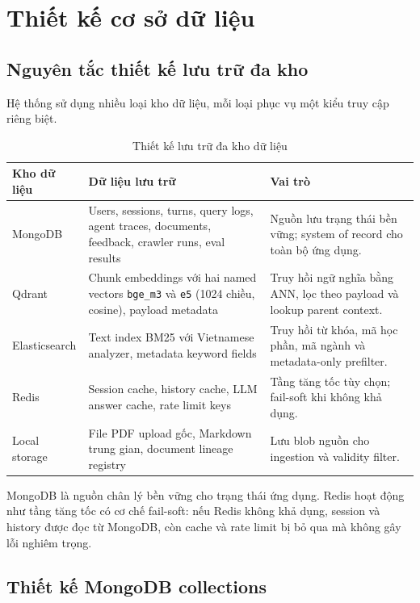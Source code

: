 \documentclass[../DoAn.tex]{subfiles}
\begin{document}
\section{Thiết kế cơ sở dữ liệu}

\subsection{Nguyên tắc thiết kế lưu trữ đa kho}

Hệ thống sử dụng nhiều loại kho dữ liệu, mỗi loại phục vụ một kiểu truy cập
riêng biệt.

\begin{table}[H]
\centering
\small
\begin{tabular}{|p{2.8cm}|p{5.0cm}|p{5.8cm}|}
\hline
\textbf{Kho dữ liệu} & \textbf{Dữ liệu lưu trữ} & \textbf{Vai trò} \\
\hline
MongoDB & Users, sessions, turns, query logs, agent traces, documents,
feedback, crawler runs, eval results & Nguồn lưu trạng thái bền vững; system
of record cho toàn bộ ứng dụng. \\
\hline
Qdrant & Chunk embeddings với hai named vectors \texttt{bge\_m3} và \texttt{e5}
(1024 chiều, cosine), payload metadata & Truy hồi ngữ nghĩa bằng ANN, lọc
theo payload và lookup parent context. \\
\hline
Elasticsearch & Text index BM25 với Vietnamese analyzer, metadata keyword
fields & Truy hồi từ khóa, mã học phần, mã ngành và metadata-only prefilter. \\
\hline
Redis & Session cache, history cache, LLM answer cache, rate limit keys & Tầng
tăng tốc tùy chọn; fail-soft khi không khả dụng. \\
\hline
Local storage & File PDF upload gốc, Markdown trung gian, document lineage
registry & Lưu blob nguồn cho ingestion và validity filter. \\
\hline
\end{tabular}
\caption{Thiết kế lưu trữ đa kho dữ liệu}
\label{tab:ch4-storage}
\end{table}

MongoDB là nguồn chân lý bền vững cho trạng thái ứng dụng. Redis hoạt động
như tầng tăng tốc có cơ chế fail-soft: nếu Redis không khả dụng, session và
history được đọc từ MongoDB, còn cache và rate limit bị bỏ qua mà không gây
lỗi nghiêm trọng.

\subsection{Thiết kế MongoDB collections}
\end{document}
